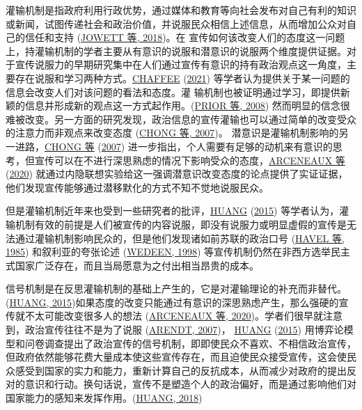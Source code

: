 \documentclass[
  12pt,
]{ctexart}
\begin{document}
灌输机制是指政府利用行政优势，通过媒体和教育等向社会发布对自己有利的知识或新闻，试图传递社会和政治价值，并说服民众相信上述信息，从而增加公众对自己的信任和支持 (\protect\hyperlink{ref-JowettODonnell2018}{JOWETT 等, 2018})。在 宣传如何该改变人们的态度这一问题上，持灌输机制的学者主要从有意识的说服和潜意识的说服两个维度提供证据。对 于宣传说服力的早期研究集中在人们通过宣传有意识的持有政治观点这一角度，主要存在说服和学习两种方式。\protect\hyperlink{ref-Chaffee2021}{CHAFFEE} (\protect\hyperlink{ref-Chaffee2021}{2021}) 等学者认为提供关于某一问题的信息会改变人们对该问题的看法和态度。灌 输机制也被证明通过学习，即提供新颖的信息并形成新的观点这一方式起作用。(\protect\hyperlink{ref-PriorLupia2008}{PRIOR 等, 2008}) 然而明显的信念很难被改变。另一方面的研究发现，政治信息的宣传灌输也可以通过简单的改变受众的注意力而非观点来改变态度 (\protect\hyperlink{ref-ChongDruckman2007}{CHONG 等, 2007})。
潜意识是灌输机制影响的另一进路，\protect\hyperlink{ref-ChongDruckman2007}{CHONG 等} (\protect\hyperlink{ref-ChongDruckman2007}{2007}) 进一步指出，个人需要有足够的动机来有意识的思考，但宣传可以在不进行深思熟虑的情况下影响受众的态度，\protect\hyperlink{ref-ArceneauxTruex2020}{ARCENEAUX 等} (\protect\hyperlink{ref-ArceneauxTruex2020}{2020}) 就通过内隐联想实验给这一强调潜意识改变态度的论点提供了实证证据，他们发现宣传能够通过潜移默化的方式不知不觉地说服民众。

但是灌输机制近年来也受到一些研究者的批评，\protect\hyperlink{ref-Huang2015a}{HUANG} (\protect\hyperlink{ref-Huang2015a}{2015}) 等学者认为，灌输机制有效的前提是人们被宣传的内容说服，即没有说服力或明显虚假的宣传是无法通过灌输机制影响民众的，但是他们发现诸如前苏联的政治口号 (\protect\hyperlink{ref-HavelWilson1985}{HAVEL 等, 1985}) 和叙利亚的夸张论述 (\protect\hyperlink{ref-Wedeen1998}{WEDEEN, 1998}) 等宣传机制仍然在非西方选举民主式国家广泛存在，而且当局愿意为之付出相当昂贵的成本。

信号机制是在反思灌输机制的基础上产生的，它是对灌输理论的补充而非替代。(\protect\hyperlink{ref-Huang2015a}{HUANG, 2015})如果态度的改变只能通过有意识的深思熟虑产生，那么强硬的宣传就不太可能改变很多人的想法 (\protect\hyperlink{ref-ArceneauxTruex2020}{ARCENEAUX 等, 2020})。学者们很早就注意到，政治宣传往往不是为了说服 (\protect\hyperlink{ref-Arendt2007}{ARENDT, 2007})， \protect\hyperlink{ref-Huang2015a}{HUANG} (\protect\hyperlink{ref-Huang2015a}{2015}) 用博弈论模型和问卷调查提出了政治宣传的信号机制，即即使民众不喜欢、不相信政治宣传，但政府依然能够花费大量成本使这些宣传存在，而且迫使民众接受宣传，这会使民众感受到国家的实力和能力，重新计算自己的反抗成本，从而减少对政府的提出反对的意识和行动。换句话说，宣传不是塑造个人的政治偏好，而是通过影响他们对国家能力的感知来发挥作用。(\protect\hyperlink{ref-Huang2018}{HUANG, 2018})
\end{document}
